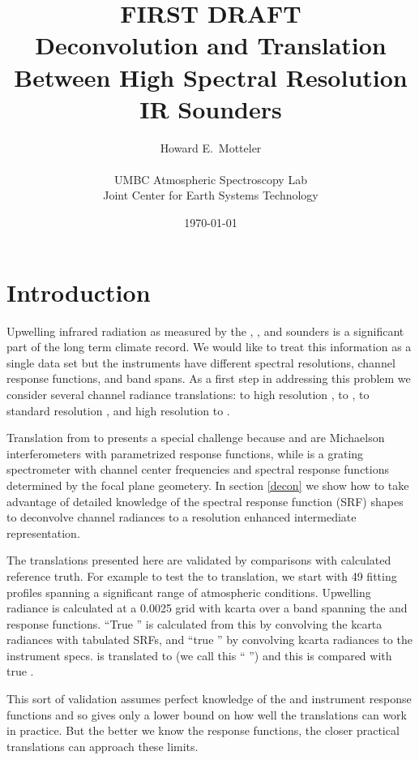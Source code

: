 \documentclass[12pt]{article}
\title{FIRST DRAFT \\
  \vspace{5mm}
  Deconvolution and Translation \\
  Between High Spectral Resolution  \\
  IR Sounders \\
}
\author{Howard E.~Motteler \\
  \\
  UMBC Atmospheric Spectroscopy Lab \\
  Joint Center for Earth Systems Technology \\
}
\date{\today}
\begin{document}
\maketitle

\section{Introduction}

Upwelling infrared radiation as measured by the {\airs}, {\iasi},
and {\cris} sounders is a significant part of the long term climate
record.  We would like to treat this information as a single data
set but the instruments have different spectral resolutions, channel
response functions, and band spans.  As a first step in addressing
this problem we consider several channel radiance translations:
{\iasi} to high resolution {\cris}, {\iasi} to {\airs}, {\airs} to
standard resolution {\cris}, and high resolution {\cris} to {\airs}.

Translation from {\airs} to {\cris} presents a special challenge
because {\cris} and {\iasi} are Michaelson interferometers with
parametrized response functions, while {\airs} is a grating
spectrometer with channel center frequencies and spectral response
functions determined by the focal plane geometery.  In section
\ref{decon} we show how to take advantage of detailed knowledge of
the {\airs} spectral response function (SRF) shapes to deconvolve
{\airs} channel radiances to a resolution enhanced intermediate
representation.

The translations presented here are validated by comparisons with
calculated reference truth.  For example to test the {\iasi} to
{\airs} translation, we start with 49 fitting profiles spanning a
significant range of atmospheric conditions.  Upwelling radiance is
calculated at a 0.0025 {\wn} grid with kcarta over a band spanning
the {\airs} and {\iasi} response functions.  ``True {\airs}'' is
calculated from this by convolving the kcarta radiances with
tabulated {\airs} SRFs, and ``true {\iasi}'' by convolving kcarta
radiances to the {\iasi} instrument specs.  {\iasi} is translated to
{\airs} (we call this ``{\iasi} {\airs}'') and this is compared with
true {\airs}.

This sort of validation assumes perfect knowledge of the {\airs} 
and {\iasi} instrument response functions and so gives only a lower
bound on how well the translations can work in practice.  But the
better we know the response functions, the closer practical
translations can approach these limits.
\end{document}
